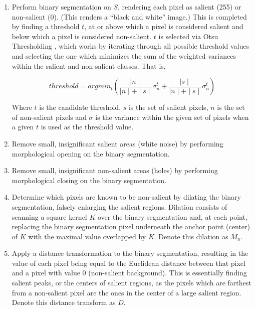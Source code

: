 \begin{enumerate}
\item
Perform binary segmentation on $S$, rendering each pixel as salient (255) or non-salient (0). (This renders a “black and white” image.) This is completed by finding a threshold $t$, at or above which a pixel is considered salient and below which a pixel is considered non-salient. $t$ is selected via Otsu Thresholding \cite{otsu1979threshold}, which works by iterating through all possible threshold values and selecting the one which minimizes the sum of the weighted variances within the salient and non-salient classes. That is,

\begin{equation}\label{eq:otsu}
    threshold=argmin_t(\frac{\mid n \mid}{\mid n \mid +\mid s \mid} \sigma_{n}^{t} + \frac{\mid s \mid}{\mid n \mid + \mid s \mid}\sigma_{n}^{t})
\end{equation}

Where $t$ is the candidate threshold, $s$ is the set of salient pixels, $n$ is the set of non-salient pixels and $\sigma$ is the variance within the given set of pixels when a given $t$ is used as the threshold value.

\item
Remove small, insignificant salient areas (white noise) by performing morphological opening on the binary segmentation.

\item
Remove small, insignificant non-salient areas (holes) by performing morphological closing on the binary segmentation.

\item
Determine which pixels are known to be non-salient by dilating the binary segmentation, falsely enlarging the salient regions. Dilation consists of scanning a square kernel $K$ over the binary segmentation and, at each point, replacing the binary segmentation pixel underneath the anchor point (center) of $K$ with the maximal value overlapped by $K$. Denote this dilation as $M_n$.

\item
Apply a distance transformation to the binary segmentation, resulting in the value of each pixel being equal to the Euclidean distance between that pixel and a pixel with value 0 (non-salient background). This is essentially finding salient peaks, or the centers of salient regions, as the pixels which are farthest from a non-salient pixel are the ones in the center of a large salient region. Denote this distance transform as $D$.


\end{enumerate}
